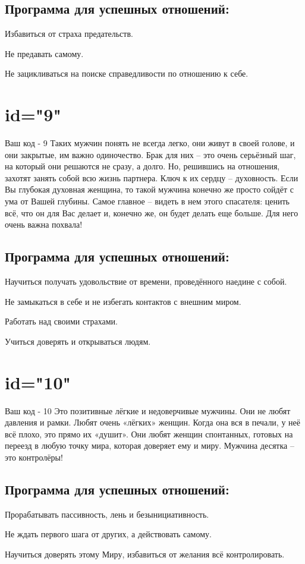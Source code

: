 \subsection{Программа для успешных отношений:}
\item Избавиться от страха предательств.
\item Не предавать самому.
\item Не зацикливаться на поиске справедливости по отношению к себе.
\endsubsection
\endsection

\section{id="9"}{Ваш код - 9}
Таких мужчин понять не всегда легко, они живут в своей голове, и они 
закрытые, им важно одиночество. Брак для них – это очень серьёзный 
шаг, на который они решаются не сразу, а долго. Но, решившись на 
отношения, захотят занять собой всю жизнь партнера. Ключ к их сердцу 
– духовность. Если Вы глубокая духовная женщина, то такой мужчина 
конечно же просто сойдёт с ума от Вашей глубины. Самое главное – 
видеть в нем этого спасателя: ценить всё, что он для Вас делает и, 
конечно же, он будет делать еще больше. Для него очень важна похвала!
\subsection{Программа для успешных отношений:}
\item Научиться получать удовольствие от времени, проведённого 
наедине с собой.
\item Не замыкаться в себе и не избегать контактов с внешним миром.
\item Работать над своими страхами.
\item Учиться доверять и открываться людям.
\endsubsection
\endsection

\section{id="10"}{Ваш код - 10}
Это позитивные лёгкие и недоверчивые мужчины. Они не любят давления 
и рамки. Любят очень «лёгких» женщин. Когда она вся в печали, у неё 
всё плохо, это прямо их «душит». Они любят женщин спонтанных, готовых 
на переезд в любую точку мира, которая доверяет ему и миру. Мужчина 
десятка – это контролёры!
\subsection{Программа для успешных отношений:}
\item Прорабатывать пассивность, лень и безынициативность.
\item Не ждать первого шага от других, а действовать самому.
\item Научиться доверять этому Миру, избавиться от желания всё 
контролировать.
\endsubsection
\endsection

